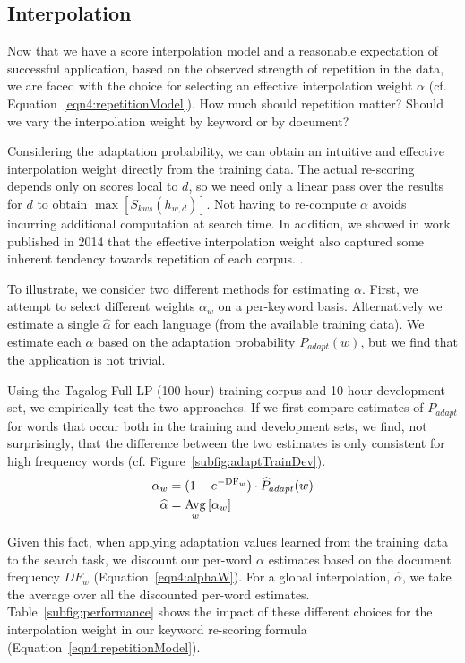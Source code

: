 \subsection{Interpolation}

Now that we have a score interpolation model and a reasonable expectation of successful application, based on the observed strength of repetition in the data, we are faced with the choice for selecting an effective interpolation weight $\alpha$ (cf. Equation~\ref{eqn4:repetitionModel}).  How much should repetition matter?  Should we vary the interpolation weight by keyword or by document?  

Considering the adaptation probability, we can obtain an intuitive and effective interpolation weight directly from the training data.   The actual re-scoring depends only on scores local to $d$, so we need only a linear pass over the results for $d$ to obtain $\max\left[S_{kws}(h_{w,d})\right]$.  Not having to re-compute $\alpha$ avoids incurring additional computation at search time.  In addition, we showed in work published in 2014 that the effective interpolation weight also captured some inherent tendency towards repetition of each corpus. \cite{wintrode2014repetition}.

To illustrate, we consider two different methods for estimating $\alpha$.  First, we attempt to select different weights $\alpha_w$ on a per-keyword basis.  Alternatively we estimate a single $\widehat{\alpha}$ for each language (from the available training data).  We estimate each $\alpha$ based on the adaptation probability $P_{adapt}(w)$, but we find that the application is not trivial.  

Using the Tagalog Full LP (100 hour) training corpus and 10 hour development set, we empirically test the two approaches.  If we first compare estimates of $P_{adapt}$ for words that occur both in the training and development sets, we find, not surprisingly, that the difference between the two estimates is only consistent for high frequency words (cf. Figure~\ref{subfig:adaptTrainDev}).
\begin{align}
\alpha_w &= (1-e^{-\mathrm{DF}_w}) \cdot \widehat{P}_{adapt}(w)
\label{eqn4:alphaW} \\
\widehat{\alpha} &= \operatorname*{Avg}_w\left[ \alpha_w \right] \label{eqn4:alphaHat}
\end{align}

Given this fact, when applying adaptation values learned from the training data to the search task, we discount our per-word $\alpha$ estimates based on the document frequency $DF_w$ (Equation~\ref{eqn4:alphaW}).  For a global interpolation, $\widehat{\alpha}$, we take the average over all the discounted per-word estimates.   Table~\ref{subfig:performance} shows the impact of these different choices for the interpolation weight in our keyword re-scoring formula (Equation~\ref{eqn4:repetitionModel}).  

